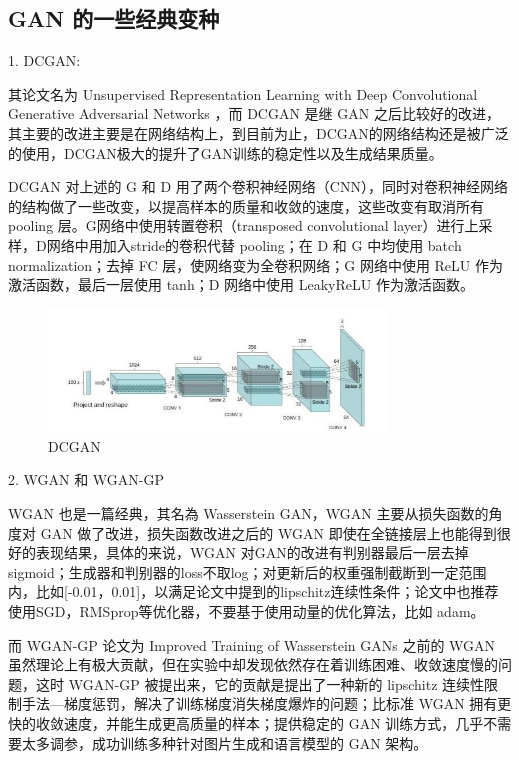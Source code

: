 
\subsection{GAN 的一些经典变种}

1. DCGAN:

其论文名为 Unsupervised Representation Learning with Deep Convolutional Generative Adversarial Networks ，而 DCGAN 是继 GAN 之后比较好的改进，其主要的改进主要是在网络结构上，到目前为止，DCGAN的网络结构还是被广泛的使用，DCGAN极大的提升了GAN训练的稳定性以及生成结果质量。

DCGAN 对上述的 G 和 D 用了两个卷积神经网络（CNN），同时对卷积神经网络的结构做了一些改变，以提高样本的质量和收敛的速度，这些改变有取消所有 pooling 层。G网络中使用转置卷积（transposed convolutional layer）进行上采样，D网络中用加入stride的卷积代替 pooling；在 D 和 G 中均使用 batch normalization；去掉 FC 层，使网络变为全卷积网络；G 网络中使用 ReLU 作为激活函数，最后一层使用 tanh；D 网络中使用 LeakyReLU 作为激活函数。

\begin{figure}[htb]
\centering 
\includegraphics[width=0.8\textwidth]{img/m2t2.jpg} 
\caption{DCGAN}
\label{Test}
\end{figure}

2. WGAN 和 WGAN-GP

WGAN 也是一篇经典，其名為 Wasserstein GAN，WGAN 主要从损失函数的角度对 GAN 做了改进，损失函数改进之后的 WGAN 即使在全链接层上也能得到很好的表现结果，具体的来说，WGAN 对GAN的改进有判别器最后一层去掉 sigmoid；生成器和判别器的loss不取log；对更新后的权重强制截断到一定范围内，比如[-0.01，0.01]，以满足论文中提到的lipschitz连续性条件；论文中也推荐使用SGD，RMSprop等优化器，不要基于使用动量的优化算法，比如 adam。

而 WGAN-GP 论文为 Improved Training of Wasserstein GANs 之前的 WGAN 虽然理论上有极大贡献，但在实验中却发现依然存在着训练困难、收敛速度慢的问题，这时 WGAN-GP 被提出来，它的贡献是提出了一种新的 lipschitz 连续性限制手法—梯度惩罚，解决了训练梯度消失梯度爆炸的问题；比标准 WGAN 拥有更快的收敛速度，并能生成更高质量的样本；提供稳定的 GAN 训练方式，几乎不需要太多调参，成功训练多种针对图片生成和语言模型的 GAN 架构。

